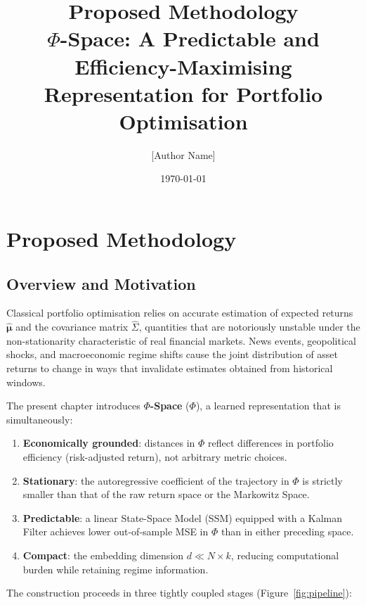 \documentclass[12pt, a4paper]{report}
\title{\textbf{Proposed Methodology}\\[0.5em]
       {\large $\Phi$-Space: A Predictable and Efficiency-Maximising\\
       Representation for Portfolio Optimisation}}
\author{[Author Name]}
\date{\today}
\theoremstyle{plain}
\theoremstyle{definition}
\newcommand{\bmu}{\bm{\mu}}
\begin{document}
\maketitle
\tableofcontents
\newpage

\chapter{Proposed Methodology}
\label{chap:proposed}

\section{Overview and Motivation}
\label{sec:overview}

Classical portfolio optimisation relies on accurate estimation of expected
returns $\hat{\bmu}$ and the covariance matrix $\hat{\Sigma}$, quantities that are
notoriously unstable under the non-stationarity characteristic of real financial
markets.  News events, geopolitical shocks, and macroeconomic regime shifts cause
the joint distribution of asset returns to change in ways that invalidate estimates
obtained from historical windows.

The present chapter introduces \textbf{$\Phi$-Space} ($\Phi$), a learned
representation that is simultaneously:
\begin{enumerate}
  \item \textbf{Economically grounded}: distances in $\Phi$ reflect differences in
        portfolio efficiency (risk-adjusted return), not arbitrary metric choices.
  \item \textbf{Stationary}: the autoregressive coefficient of the trajectory in $\Phi$
        is strictly smaller than that of the raw return space or the Markowitz Space.
  \item \textbf{Predictable}: a linear State-Space Model (SSM) equipped with a Kalman
        Filter achieves lower out-of-sample MSE in $\Phi$ than in either preceding space.
  \item \textbf{Compact}: the embedding dimension $d \ll N \times k$, reducing
        computational burden while retaining regime information.
\end{enumerate}

The construction proceeds in three tightly coupled stages (Figure~\ref{fig:pipeline}):
\end{document}
